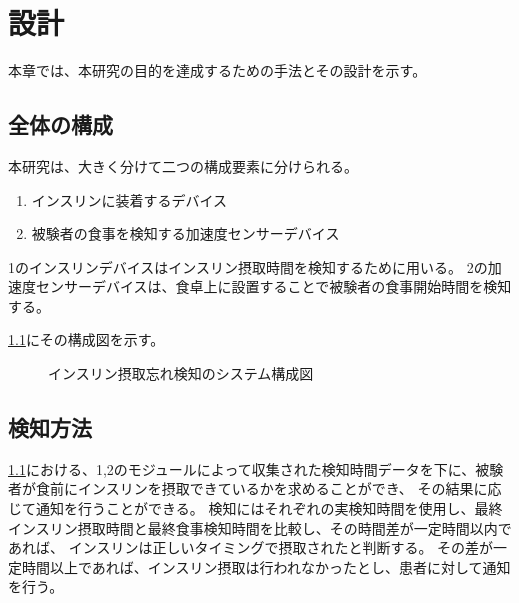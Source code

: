 \chapter{設計}
\label{chap:design}

本章では、本研究の目的を達成するための手法とその設計を示す。

\section{全体の構成}
本研究は、大きく分けて二つの構成要素に分けられる。

\begin{enumerate}
  \item インスリンに装着するデバイス
  \item 被験者の食事を検知する加速度センサーデバイス
\end{enumerate}

1のインスリンデバイスはインスリン摂取時間を検知するために用いる。
2の加速度センサーデバイスは、食卓上に設置することで被験者の食事開始時間を検知する。

\ref{fig:insulin_design}にその構成図を示す。

\begin{figure}
  \caption{インスリン摂取忘れ検知のシステム構成図}
  \label{fig:insulin_design}
  \begin{center}
  \end{center}
\end{figure}

\section{検知方法}

\ref{fig:insulin_design}における、1,2のモジュールによって収集された検知時間データを下に、被験者が食前にインスリンを摂取できているかを求めることができ、
その結果に応じて通知を行うことができる。
検知にはそれぞれの実検知時間を使用し、最終インスリン摂取時間と最終食事検知時間を比較し、その時間差が一定時間以内であれば、
インスリンは正しいタイミングで摂取されたと判断する。
その差が一定時間以上であれば、インスリン摂取は行われなかったとし、患者に対して通知を行う。



